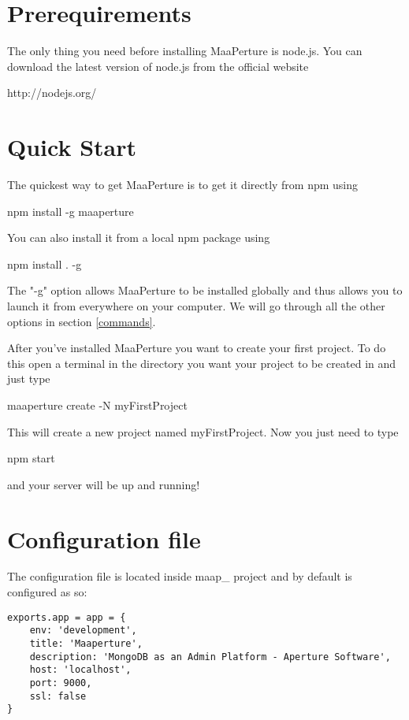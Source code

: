 \section{Prerequirements}
The only thing you need before installing MaaPerture is node.js.
You can download the latest version of node.js from the official website
\begin{center}
http://nodejs.org/
\end{center}

\section{Quick Start}
The quickest way to get MaaPerture is to get it directly from npm using
\begin{center}
npm install -g maaperture
\end{center}

You can also install it from a local npm package using 
\begin{center}
npm install . -g
\end{center}

The "-g" option allows MaaPerture to be installed globally and thus allows you to launch it from everywhere on your computer.
We will go through all the other options in section \ref{commands}.

After you've installed MaaPerture you want to create your first project.
To do this open a terminal in the directory you want your project to be created in and just type
\begin{center}
 maaperture create -N myFirstProject
\end{center}

This will create a new project named myFirstProject.
Now you just need to type
\begin{center}
npm start
\end{center}

and your server will be up and running!




\newpage
\section{Configuration file}

The configuration file is located inside   maap\_ project and by default is configured as so:


\begin{verbatim}
exports.app = app = {
	env: 'development',
	title: 'Maaperture',
	description: 'MongoDB as an Admin Platform - Aperture Software',
	host: 'localhost',
	port: 9000,
	ssl: false
}

\end{verbatim}

